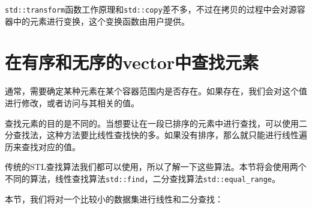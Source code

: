 
\texttt{std::transform}函数工作原理和\texttt{std::copy}差不多，不过在拷贝的过程中会对源容器中的元素进行变换，这个变换函数由用户提供。


\section{在有序和无序的vector中查找元素}

通常，需要确定某种元素在某个容器范围内是否存在。如果存在，我们会对这个值进行修改，或者访问与其相关的值。

查找元素的目的是不同的。当想要让在一段已排序的元素中进行查找，可以使用二分查找法，这种方法要比线性查找快的多。如果没有排序，那么就只能进行线性遍历来查找对应的值。

传统的STL查找算法我们都可以使用，所以了解一下这些算法。本节将会使用两个不同的算法，线性查找算法\texttt{std::find}，二分查找算法\texttt{std::equal\_range}。


本节，我们将对一个比较小的数据集进行线性和二分查找：

